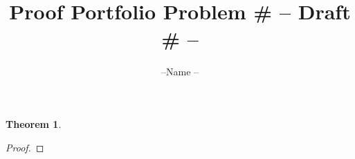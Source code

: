 \documentclass{article}  %
\title{Proof Portfolio Problem \# --  Draft \# --}
\author{--Name --}
\date{}
\newtheorem*{thm}{Theorem}
\begin{document}
\maketitle  %

\begin{thm}
\end{thm}

\begin{proof}
\end{proof}
\end{document}
